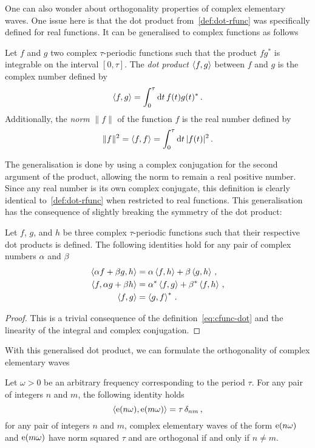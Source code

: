 One can also wonder about orthogonality properties of complex elementary waves. One issue
here is that the dot product from~\cref{def:dot-rfunc} was specifically defined for real
functions. It can be generalised to complex functions as follows
\begin{definition}
  Let $f$ and $g$ two complex $\tau$-periodic functions such that the product $fg^*$ is
  integrable on the interval $[0,\tau]$. The \emph{dot product} $\braket{f,g}$ between $f$
  and $g$ is the complex number defined by
  \begin{equation}
    \braket{f,g}=\int_{0}^{\tau}\mathrm{d} t\, f(t)g(t)^*\,.\label{eq:cfunc-dot}
  \end{equation}
  Additionally, the \emph{norm} $\|f\|$ of the function $f$ is the real number defined by
  \begin{equation}
    \|f\|^2=\braket{f,f}=\int_{0}^{\tau}\mathrm{d} t\, |f(t)|^2\,.
  \end{equation}
\end{definition}
The generalisation is done by using a complex conjugation for the second argument of the
product, allowing the norm to remain a real positive number. Since any real number is its
own complex conjugate, this definition is clearly identical to~\cref{def:dot-rfunc} when
restricted to real functions. This generalisation has the consequence of slightly breaking
the symmetry of the dot product:
\begin{proposition}
  Let $f$, $g$, and $h$ be three complex $\tau$-periodic functions such that their
  respective dot products is defined. The following identities hold for any pair of
  complex numbers $\alpha$ and $\beta$
  \begin{align}
    \braket{\alpha f+\beta g,h}&=\alpha\braket{f,h}+\beta\braket{g,h}\,,\\
    \braket{f,\alpha g+\beta h}&=\alpha^*\braket{f,g}+\beta^*\braket{f,h}\,,\\
    \braket{f,g}&=\braket{g,f}^*\,.
  \end{align}
\end{proposition}
\begin{proof}
  This is a trivial consequence of the definition~\cref{eq:cfunc-dot} and the linearity of
  the integral and complex conjugation.
\end{proof}
With this generalised dot product, we can formulate the orthogonality of complex
elementary waves
\begin{theorem}
  \label{thm:orth-complex}
  Let $\omega>0$ be an arbitrary frequency corresponding to the period $\tau$. For any
  pair of integers $n$ and $m$, the following identity holds
  \begin{equation}
    \braket{\operatorname{e}(n\omega),\operatorname{e}(m\omega)}=\tau\,\delta_{nm}\,,
  \end{equation}
  \ie for any pair of integers $n$ and $m$, complex elementary waves of the form
  $\operatorname{e}(n\omega)$ and $\operatorname{e}(m\omega)$ have norm squared $\tau$ and are orthogonal if and
  only if $n\neq m$.
\end{theorem}
